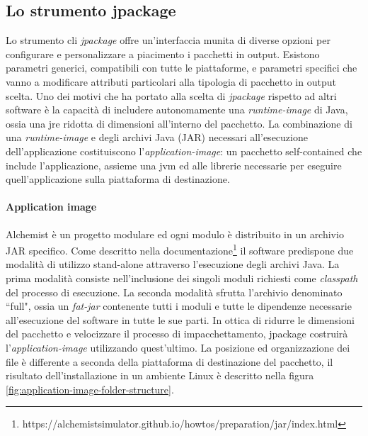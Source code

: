 \subsection{Lo strumento jpackage}\label{sec:design-jpackage}
Lo strumento \ac{cli} \textit{jpackage} offre un'interfaccia munita di diverse opzioni per configurare e personalizzare a piacimento i pacchetti in output. Esistono parametri generici, compatibili con tutte le piattaforme, e parametri specifici che vanno a modificare attributi particolari alla tipologia di pacchetto in output scelta. Uno dei motivi che ha portato alla scelta di \textit{jpackage} rispetto ad altri software è la capacità di includere autonomamente una \textit{runtime-image} di Java, ossia una \ac{jre} ridotta di dimensioni all'interno del pacchetto. La combinazione di una \textit{runtime-image} e degli archivi Java (JAR) necessari all'esecuzione dell'applicazione costituiscono l'\textit{application-image}: un pacchetto self-contained che include l'applicazione, assieme una \ac{jvm} ed alle librerie necessarie per eseguire quell'applicazione sulla piattaforma di destinazione.

\paragraph{Application image} Alchemist è un progetto modulare ed ogni modulo è distribuito in un archivio JAR specifico. Come descritto nella documentazione\footnote{https://alchemistsimulator.github.io/howtos/preparation/jar/index.html} il software predispone due modalità di utilizzo stand-alone attraverso l'esecuzione degli archivi Java. La prima modalità consiste nell'inclusione dei singoli moduli richiesti come \textit{classpath} del processo di esecuzione. La seconda modalità sfrutta l'archivio denominato ``full", ossia un \textit{fat-jar} contenente tutti i moduli e tutte le dipendenze necessarie all'esecuzione del software in tutte le sue parti. In ottica di ridurre le dimensioni del pacchetto e velocizzare il processo di impacchettamento, jpackage costruirà l'\textit{application-image} utilizzando quest'ultimo. La posizione ed organizzazione dei file è differente a seconda della piattaforma di destinazione del pacchetto, il risultato dell'installazione in un ambiente Linux è descritto nella figura \ref{fig:application-image-folder-structure}.  

